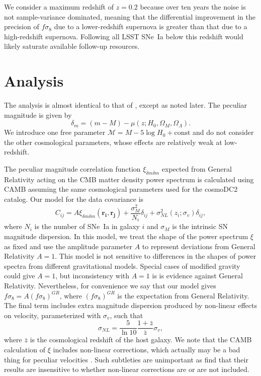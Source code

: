 \documentclass{aastex62}   	%
\begin{document}
We consider a maximum redshift of $z=0.2$ because over ten years the noise is not sample-variance dominated, meaning that the differential improvement
in the precision of
$f\sigma_8$ due to a lower-redshift supernova is greater than that due to a high-redshift supernova.  Following all LSST SNe~Ia below this redshift 
would likely saturate available follow-up resources.


\section{Analysis}
The analysis is  almost identical to that of \citet{2015JCAP...12..033H, 2017JCAP...05..015H}, except as noted later.  
The peculiar magnitude is given by 
\begin{equation}
\delta_m=(m - M) - \mu(z;H_0, \Omega_M, \Omega_\Lambda).
\label{data:eqn}
\end{equation}  We introduce one free parameter 
$\mathcal{M} = M - 5\log{H_0} + \text{const}$ and do not consider the other cosmological parameters, whose effects are relatively weak at low-redshift.


The peculiar magnitude correlation
function $\xi_{\delta m \delta m}$ \citep{2011ApJ...741...67D,2015JCAP...12..033H} expected from General Relativity acting on the CMB
matter density power spectrum is calculated using CAMB \citep{Lewis:2002ah}  assuming the same
cosmological parameters used for the cosmoDC2 catalog.  Our model for the data covariance
is
\begin{equation}
C_{ij} = A\xi_{\delta m \delta m}(\mathbf{r_i},\mathbf{r_j}) + \frac{\sigma_M^2}{N_i} \delta_{ij} + \sigma^2_{NL}(z_i;\sigma_{v})\delta_{ij},
\label{cov:eqn}
\end{equation}
where $N_i$ is the number of SNe~Ia in galaxy $i$ and $\sigma_M$ is the intrinsic SN magnitude dispersion.
In this model, we treat the shape of the power spectrum $\xi$ as fixed and use the amplitude parameter $A$ to represent
deviations from General Relativity $A=1$.  This model is not sensitive to differences in the shapes
of  power spectra from different gravitational models.   Special cases of modified gravity could give $A=1$, but inconsistency with $A=1$ is is evidence against General Relativity.
Nevertheless, for
convenience we say that our model gives $f\sigma_8 = A (f\sigma_8)^{GR}$, where $(f\sigma_8)^{GR}$ is the expectation
from General Relativity. 
The final term includes extra magnitude dispersion produced by non-linear effects on velocity, parameterized with $\sigma_{v}$, such that
\begin{equation}
\sigma_{NL} = \frac{5}{\ln{10}} \frac{1+\bar{z}}{\bar{z}} \sigma_v,
\end{equation}
where $\bar{z}$ is the cosmological redshift of the host galaxy.
We note that the CAMB calculation of $\xi$ includes non-linear corrections, which actually may be a bad thing for peculiar velocities \citep{2015MNRAS.454.3920H}. 
Such subtleties are unimportant as \citet{2015JCAP...12..033H} find that their results are insensitive to whether non-linear corrections are or are not included.
\end{document}
